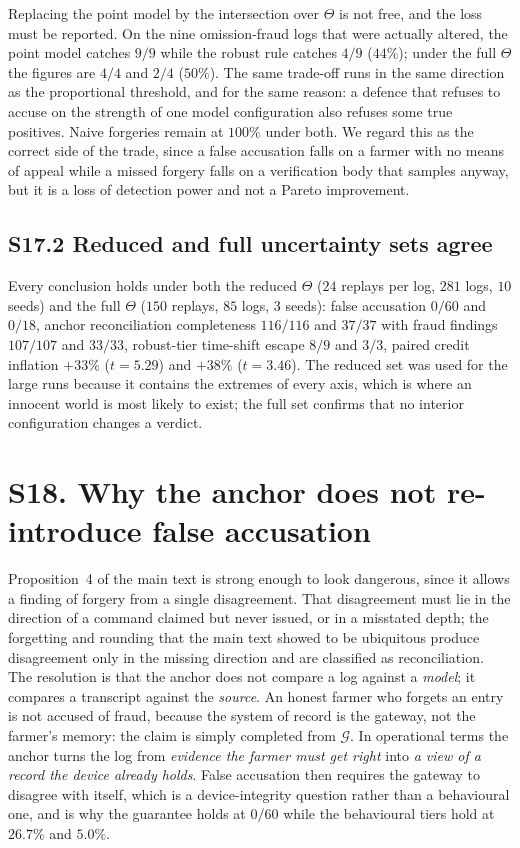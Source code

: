 Replacing the point model by the intersection over $\Theta$ is not free, and
the loss must be reported. On the nine omission-fraud logs that were actually
altered, the point model catches $9/9$ while the robust rule catches $4/9$
($44\%$); under the full $\Theta$ the figures are $4/4$ and $2/4$ ($50\%$).
The same trade-off runs in the same direction as the proportional threshold,
and for the same reason: a defence that refuses to accuse on the strength of
one model configuration also refuses some true positives. Naive forgeries
remain at $100\%$ under both. We regard this as the correct side of the trade,
since a false accusation falls on a farmer with no means of appeal while a
missed forgery falls on a verification body that samples anyway, but it is a
loss of detection power and not a Pareto improvement.

\subsection*{S17.2 Reduced and full uncertainty sets agree}

Every conclusion holds under both the reduced $\Theta$ ($24$ replays per log,
$281$ logs, $10$ seeds) and the full $\Theta$ ($150$ replays, $85$ logs,
$3$ seeds): false accusation $0/60$ and $0/18$, anchor reconciliation completeness $116/116$
and $37/37$ with fraud findings $107/107$ and $33/33$, robust-tier time-shift
escape $8/9$ and $3/3$, paired credit
inflation $+33\%$ ($t=5.29$) and $+38\%$ ($t=3.46$). The reduced set was used
for the large runs because it contains the extremes of every axis, which is
where an innocent world is most likely to exist; the full set confirms that no
interior configuration changes a verdict.

\section*{S18. Why the anchor does not re-introduce false accusation}

Proposition~4 of the main text is strong enough to look dangerous, since it allows a
finding of forgery from a single disagreement. That disagreement must lie in the
direction of a command claimed but never issued, or in a misstated depth; the
forgetting and rounding that the main text showed to be ubiquitous produce disagreement
only in the missing direction and are classified as reconciliation. The resolution is that the anchor does
not compare a log against a \emph{model}; it compares a transcript against the
\emph{source}. An honest farmer who forgets an entry is not accused of fraud,
because the system of record is the gateway, not the farmer's memory: the claim
is simply completed from $\mathcal{G}$. In operational terms the anchor turns
the log from \emph{evidence the farmer must get right} into \emph{a view of a
record the device already holds}. False accusation then requires the gateway to
disagree with itself, which is a device-integrity question rather than a
behavioural one, and is why the guarantee holds at $0/60$ while the behavioural
tiers hold at $26.7\%$ and $5.0\%$.

